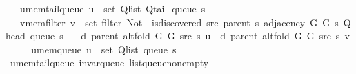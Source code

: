 \begin{isabellebody}
\ \ \ u{\isacharunderscore}{\kern0pt}mem{\isacharunderscore}{\kern0pt}tail{\isacharunderscore}{\kern0pt}queue{\isacharcolon}{\kern0pt}\ {\isachardoublequoteopen}u\ {\isasymin}\ set\ {\isacharparenleft}{\kern0pt}Q{\isacharunderscore}{\kern0pt}list\ {\isacharparenleft}{\kern0pt}Q{\isacharunderscore}{\kern0pt}tail\ {\isacharparenleft}{\kern0pt}queue\ s{\isacharparenright}{\kern0pt}{\isacharparenright}{\kern0pt}{\isacharparenright}{\kern0pt}{\isachardoublequoteclose}\isanewline
\ \ \ v{\isacharunderscore}{\kern0pt}mem{\isacharunderscore}{\kern0pt}filter{\isacharcolon}{\kern0pt}\ {\isachardoublequoteopen}v\ {\isasymin}\ set\ {\isacharparenleft}{\kern0pt}filter\ {\isacharparenleft}{\kern0pt}Not\ {\isasymcirc}\ is{\isacharunderscore}{\kern0pt}discovered\ src\ {\isacharparenleft}{\kern0pt}parent\ s{\isacharparenright}{\kern0pt}{\isacharparenright}{\kern0pt}\ {\isacharparenleft}{\kern0pt}adjacency\ G{}\ G{}\ s\ {\isacharparenleft}{\kern0pt}Q{\isacharunderscore}{\kern0pt}head\ {\isacharparenleft}{\kern0pt}queue\ s{\isacharparenright}{\kern0pt}{\isacharparenright}{\kern0pt}{\isacharparenright}{\kern0pt}{\isacharparenright}{\kern0pt}{\isachardoublequoteclose}\isanewline
\ \ \ {\isachardoublequoteopen}d\ {\isacharparenleft}{\kern0pt}parent\ {\isacharparenleft}{\kern0pt}alt{\isacharunderscore}{\kern0pt}fold\ G{}\ G{}\ src\ s{\isacharparenright}{\kern0pt}{\isacharparenright}{\kern0pt}\ u\ {\isasymle}\ d\ {\isacharparenleft}{\kern0pt}parent\ {\isacharparenleft}{\kern0pt}alt{\isacharunderscore}{\kern0pt}fold\ G{}\ G{}\ src\ s{\isacharparenright}{\kern0pt}{\isacharparenright}{\kern0pt}\ v{\isachardoublequoteclose}%
\endisataginvisible
{\isafoldinvisible}%
%
\isadeliminvisible
\isanewline
%
\endisadeliminvisible
%
\isadelimproof
%
\endisadelimproof
%
\isatagproof
{}\isamarkupfalse%
\ {\isacharminus}{\kern0pt}\isanewline
\ \ \isamarkupfalse%
\ u{\isacharunderscore}{\kern0pt}mem{\isacharunderscore}{\kern0pt}queue{\isacharcolon}{\kern0pt}\ {\isachardoublequoteopen}u\ {\isasymin}\ set\ {\isacharparenleft}{\kern0pt}Q{\isacharunderscore}{\kern0pt}list\ {\isacharparenleft}{\kern0pt}queue\ s{\isacharparenright}{\kern0pt}{\isacharparenright}{\kern0pt}{\isachardoublequoteclose}\isanewline
\ \ \ \ \isamarkupfalse%
\ u{\isacharunderscore}{\kern0pt}mem{\isacharunderscore}{\kern0pt}tail{\isacharunderscore}{\kern0pt}queue\ invar{\isacharunderscore}{\kern0pt}queue\ list{\isacharunderscore}{\kern0pt}queue{\isacharunderscore}{\kern0pt}non{\isacharunderscore}{\kern0pt}empty\isanewline

\end{isabellebody}
